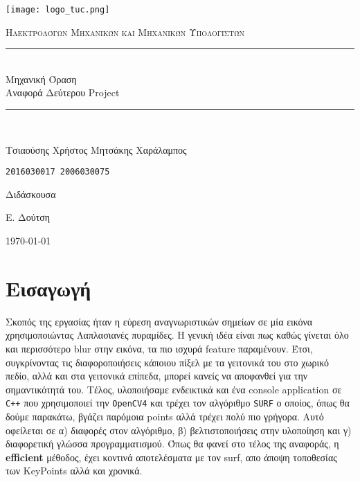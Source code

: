 \documentclass[11pt]{scrartcl} %
\begin{document}
\begin{titlepage}
    \centering
    \texttt{[image: logo\_tuc.png]}\par\vspace{1cm}
    \normalfont\normalsize
    \textsc{\textcolor[rgb]{0.66, 0.09, 0.19}{Ηλεκτρολόγων Μηχανικών και Μηχανικών Υπολογιστών}}\\ %
    \vspace{25pt} %
    \rule{\linewidth}{0.5pt}\\ %
    \vspace{20pt} %
    {\Huge Μηχανική Όραση}\\ %

    {\huge Αναφορά Δεύτερου Project}\\ %
    \vspace{12pt} %
    \rule{\linewidth}{2pt}\\ %
    \vspace{12pt} %
    \vspace{2cm}

    {\LARGE{Τσιαούσης Χρήστος \hfill Μητσάκης Χαράλαμπος}
        \par
        \texttt{2016030017 \hfill 2006030075}
        \par
    }

    \vfill
    Διδάσκουσα

    Ε. Δούτση

    \vfill

    {\large \today\par}
\end{titlepage}

\newpage



\section{Εισαγωγή}
Σκοπός της εργασίας ήταν η εύρεση αναγνωριστικών σημείων σε μία εικόνα χρησιμοποιώντας Λαπλασιανές πυραμίδες.
Η γενική ιδέα είναι πως καθώς γίνεται όλο και περισσότερο blur στην εικόνα, τα πιο ισχυρά feature παραμένουν.
Έτσι, συγκρίνοντας τις διαφοροποιήσεις κάποιου πίξελ με τα γειτονικά του στο χωρικό πεδίο, αλλά και στα γειτονικά
επίπεδα, μπορεί κανείς να αποφανθεί για την σημαντικότητά του. Τέλος, υλοποιήσαμε ενδεικτικά και ένα console
application σε \texttt{C++} που χρησιμοποιεί την \texttt{OpenCV4} και τρέχει τον αλγόριθμο \texttt{SURF} ο οποίος,
όπως θα δούμε παρακάτω, βγάζει παρόμοια points αλλά τρέχει πολύ πιο γρήγορα. Αυτό οφείλεται σε α) διαφορές στον αλγόριθμο,
β) βελτιστοποιήσεις στην υλοποίηση και γ) διαφορετική γλώσσα προγραμματισμού. Όπως θα φανεί στο τέλος της αναφοράς,
η \textbf{efficient} μέθοδος, έχει κοντινά αποτελέσματα με τον surf, απο άποψη τοποθεσίας των KeyPoints αλλά και χρονικά.
\end{document}
